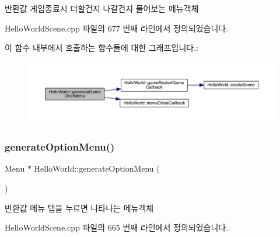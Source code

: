 \begin{DoxyReturn}{반환값}
게임종료시 더할건지 나갈건지 물어보는 메뉴객체 
\end{DoxyReturn}


Hello\+World\+Scene.\+cpp 파일의 677 번째 라인에서 정의되었습니다.

이 함수 내부에서 호출하는 함수들에 대한 그래프입니다.\+:
\nopagebreak
\begin{figure}[H]
\begin{center}
\leavevmode
\includegraphics[width=350pt]{class_hello_world_a7b22f04ccc721e47e59c4f5470768790_cgraph}
\end{center}
\end{figure}
\mbox{\label{class_hello_world_a24162678657656105f59887233f9c841}} 
\subsubsection{\texorpdfstring{generate\+Option\+Menu()}{generateOptionMenu()}}
{\footnotesize\ttfamily Menu $\ast$ Hello\+World\+::generate\+Option\+Menu (\begin{DoxyParamCaption}{ }\end{DoxyParamCaption})\hspace{0.3cm}{\ttfamily [protected]}}

\begin{DoxyReturn}{반환값}
메뉴 탭을 누르면 나타나는 메뉴객체 
\end{DoxyReturn}


Hello\+World\+Scene.\+cpp 파일의 665 번째 라인에서 정의되었습니다.

